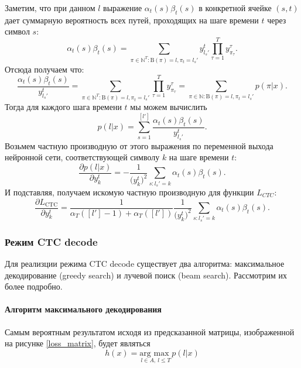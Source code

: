 Заметим, что при данном $l$ выражение $\alpha_t(s)\beta_t(s)$ в конкретной ячейке $(s,t)$ дает суммарную вероятность всех путей, проходящих на шаге времени $t$ через символ $s$:
\begin{equation}
    \alpha_t(s)\beta_t(s) = \sum\limits_{\pi\in\mathbb{N}^T:\text{B}(\pi)=l,\pi_t=l_s'} y_{l_s'}^t \prod\limits_{\tau=1}^T y_{\pi_{\tau}}^\tau.
\end{equation}
Отсюда получаем что:
\begin{equation}
    \dfrac{\alpha_t(s)\beta_t(s)}{y_{l_s'}^t} = \sum\limits_{\pi\in\mathbb{N}^T:\text{B}(\pi)=l,\pi_t=l_s'} \prod\limits_{\tau=1}^T y_{\pi_{\tau}}^\tau = \sum\limits_{\pi\in\mathbb{N}:\text{B}(\pi)=l,\pi_t=l_s'} p(\pi|x).
\end{equation}
Тогда для каждого шага времени $t$ мы можем вычислить
\begin{equation}
    p(l|x) = \sum\limits_{s=1}^{[l']}\dfrac{\alpha_t(s)\beta_t(s)}{y_{l_s'}^t}.
\end{equation}
Возьмем частную производную от этого выражения по переменной выхода нейронной сети, соответствующей символу $k$ на шаге времени $t$:
\begin{equation}
    \dfrac{\partial p(l|x)}{\partial y_k^t}=-\dfrac{1}{\bigl(y_k^t\bigr)^2}\sum\limits_{s:l_s'=k}\alpha_t(s)\beta_t(s).
\end{equation}
И подставляя, получаем искомую частную производную для функции $L_{CTC}$:
\begin{equation}
    \dfrac{\partial L_\text{CTC}}{\partial y_k^t} = \dfrac{1}{\alpha_T([l']-1)+\alpha_T([l'])}\dfrac{1}{\bigl(y_k^t\bigr)^2}\sum\limits_{s:l_s'=k}\alpha_t(s)\beta_t(s).
\end{equation}

\subsubsection{Режим CTC decode}

Для реализции режима CTC decode существует два алгоритма: максимальное декодирование (greedy search) и лучевой поиск (beam search). Рассмотрим их более подробно.

\paragraph{Алгоритм максимального декодирования}

Самым вероятным результатом исходя из предсказанной матрицы, изображенной на рисунке \ref{loss_matrix}, будет являться
\begin{equation}
    h(x) = \underset{l\in A,\ l\leq T}{\text{arg max }}p(l|x)
\end{equation}

